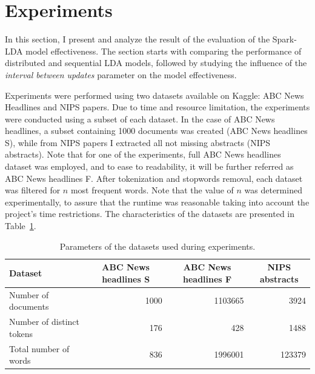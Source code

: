 \documentclass[journal]{IEEEtran}
\begin{document}
\section{Experiments}
\label{sec:exp}
In this section, I present and analyze the result of the evaluation of the Spark-LDA model effectiveness. The section starts with comparing the performance of distributed and sequential LDA models, followed by studying the influence of the \textit{interval between updates} parameter on the model effectiveness.

Experiments were performed using two datasets available on Kaggle: ABC News Headlines and NIPS papers. Due to time and resource limitation, the experiments were  conducted using a subset of each dataset. In the case of ABC News headlines, a subset containing 1000 documents was created (ABC News headlines S), while from NIPS papers I extracted all not missing abstracts (NIPS abstracts). Note that for one of the experiments, full ABC News headlines dataset was employed, and to ease to readability, it will be further referred as ABC News headlines F. After tokenization and stopwords removal, each dataset was filtered for $n$ most frequent words. Note that the value of $n$ was determined experimentally, to assure that the runtime was reasonable taking into account the project's time restrictions. The characteristics of the datasets are presented in Table~\ref{tab:datasets}.


\renewcommand{\arraystretch}{1.2}
\begin{table}[t]
\centering
\caption{Parameters of the datasets used during experiments.}
\label{tab:datasets}
\begin{tabular}{lrrr} \toprule
Dataset                   & \multicolumn{1}{c}{ABC News headlines S} & \multicolumn{1}{c}{ABC News headlines F} & \multicolumn{1}{c}{NIPS abstracts} \\ \midrule
Number of documents       & 1000                                     & 1103665                                  & 3924                               \\
Number of distinct tokens & 176                                      & 428                                      & 1488                               \\
Total number of words     & 836                                      & 1996001                                  & 123379    \\ \bottomrule                        
\end{tabular}
\end{table}
\end{document}
